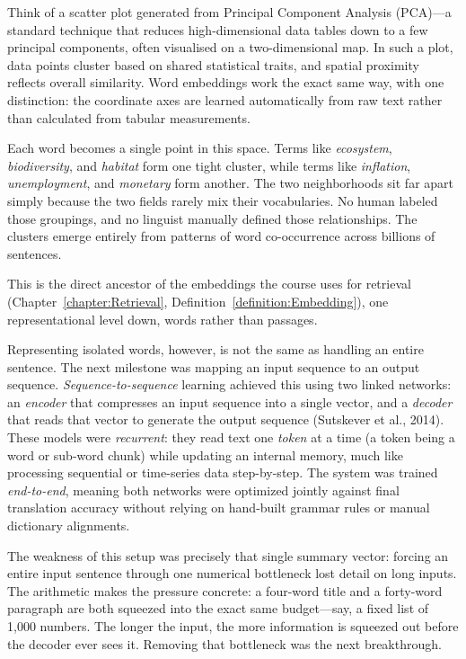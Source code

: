 \begin{example}
Think of a scatter plot generated from Principal Component Analysis (PCA)—a standard technique that reduces high-dimensional data tables down to a few principal components, often visualised on a two-dimensional map.
In such a plot, data points cluster based on shared statistical traits, and spatial proximity reflects overall similarity.
Word embeddings work the exact same way, with one distinction: the coordinate axes are learned automatically from raw text rather than calculated from tabular measurements.

Each word becomes a single point in this space.
Terms like \emph{ecosystem}, \emph{biodiversity}, and \emph{habitat} form one tight cluster, while terms like \emph{inflation}, \emph{unemployment}, and \emph{monetary} form another.
The two neighborhoods sit far apart simply because the two fields rarely mix their vocabularies.
No human labeled those groupings, and no linguist manually defined those relationships.
The clusters emerge entirely from patterns of word co-occurrence across billions of sentences.
\end{example}

This is the direct ancestor of the embeddings the course uses for retrieval (Chapter~\ref{chapter:Retrieval}, Definition~\ref{definition:Embedding}), one representational level down, words rather than passages.

Representing isolated words, however, is not the same as handling an entire sentence.
The next milestone was mapping an input sequence to an output sequence.
\emph{Sequence-to-sequence} learning achieved this using two linked networks: an \emph{encoder} that compresses an input sequence into a single vector, and a \emph{decoder} that reads that vector to generate the output sequence (Sutskever et al., 2014).
These models were \emph{recurrent}: they read text one \emph{token} at a time (a token being a word or sub-word chunk) while updating an internal memory, much like processing sequential or time-series data step-by-step.
The system was trained \emph{end-to-end}, meaning both networks were optimized jointly against final translation accuracy without relying on hand-built grammar rules or manual dictionary alignments.

The weakness of this setup was precisely that single summary vector: forcing an entire input sentence through one numerical bottleneck lost detail on long inputs.
The arithmetic makes the pressure concrete: a four-word title and a forty-word paragraph are both squeezed into the exact same budget—say, a fixed list of 1,000 numbers.
The longer the input, the more information is squeezed out before the decoder ever sees it.
Removing that bottleneck was the next breakthrough.


